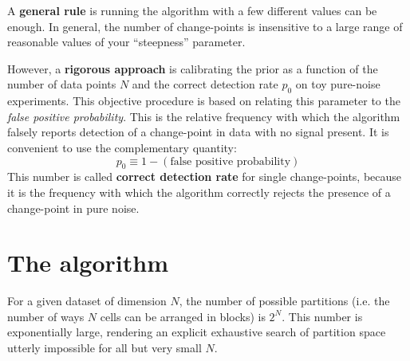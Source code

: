 \documentclass[prb,twocolumn]{revtex4-1}
\begin{document}
A \textbf{general rule} is running the algorithm with a few different values can be enough. In general, the number of change-points is insensitive to a large range of reasonable values of your “steepness” parameter.

However, a \textbf{rigorous approach} is calibrating the prior as a function of the number of data points $N$ and the correct detection rate $p_0$ on toy pure-noise experiments. 
This objective procedure is based on relating this parameter to the \textit{false positive probability}. This is the relative frequency with which the algorithm falsely reports detection of a change-point in data with no signal present. It is convenient to use the complementary quantity:
\begin{equation*}
p_0 \equiv 1 - (\text{false positive probability})
\end{equation*}
This number is called \textbf{correct detection rate} for single change-points, because it is the frequency with which the algorithm correctly rejects the presence of a change-point in pure noise. 






\section{The algorithm}

For a given dataset of dimension $N$, the number of possible partitions (i.e. the number of ways $N$ cells can be arranged in blocks) is $2^N$. This number is exponentially large, rendering an explicit exhaustive search of partition space utterly impossible for all but very small $N$. 
\end{document}
